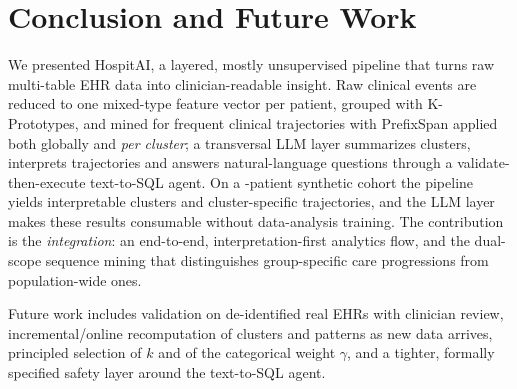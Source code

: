 \section{Conclusion and Future Work}\label{sec:conclusion}

We presented HospitAI, a layered, mostly unsupervised pipeline that turns raw
multi-table EHR data into clinician-readable insight. Raw clinical events are
reduced to one mixed-type feature vector per patient, grouped with K-Prototypes,
and mined for frequent clinical trajectories with PrefixSpan applied both
globally and \emph{per cluster}; a transversal LLM layer summarizes clusters,
interprets trajectories and answers natural-language questions through a
validate-then-execute text-to-SQL agent. On a \NPATIENTS{}-patient synthetic
cohort the pipeline yields interpretable clusters and cluster-specific
trajectories, and the LLM layer makes these results consumable without
data-analysis training. The contribution is the \emph{integration}: an
end-to-end, interpretation-first analytics flow, and the dual-scope sequence
mining that distinguishes group-specific care progressions from population-wide
ones.

Future work includes validation on de-identified real EHRs with clinician
review, incremental/online recomputation of clusters and patterns as new data
arrives, principled selection of $k$ and of the categorical weight $\gamma$, and
a tighter, formally specified safety layer around the text-to-SQL agent.
